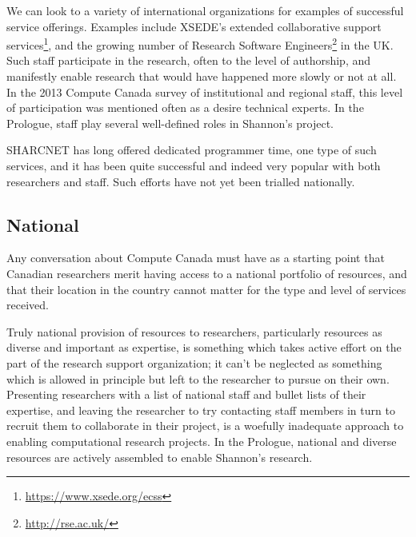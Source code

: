 \documentclass[11pt, letterpaper, twoside]{article}
\begin{document}
We can look to a variety of international organizations for examples of
successful service offerings. Examples include XSEDE's extended
collaborative support services\footnote{\url{https://www.xsede.org/ecss}}, and the growing
number of Research Software Engineers\footnote{\url{http://rse.ac.uk/}} in the UK.  Such
staff participate in the research, often to the level of authorship, and
manifestly enable research that would have happened more slowly or not
at all. In the 2013 Compute Canada survey of institutional and regional
staff, this level of participation was mentioned often as a desire
technical experts. In the Prologue, staff play several well-defined
roles in Shannon's project.

SHARCNET has long offered dedicated programmer time, one type of such
services, and it has been quite successful and indeed very popular with
both researchers and staff. Such efforts have not yet been trialled
nationally.

\subsection*{National}
%

Any conversation about Compute Canada must have as a starting point that
Canadian researchers merit having access to a national portfolio of
resources, and that their location in the country cannot matter for the
type and level of services received.


Truly national provision of resources to researchers, particularly
resources as diverse and important as expertise, is something which
takes active effort on the part of the research support organization; it
can't be neglected as something which is allowed in principle but left
to the researcher to pursue on their own. Presenting researchers with a
list of national staff and bullet lists of their expertise, and leaving
the researcher to try contacting staff members in turn to recruit them
to collaborate in their project, is a woefully inadequate approach to
enabling computational research projects. In the Prologue, national and
diverse resources are actively assembled to enable Shannon's research.
\end{document}
